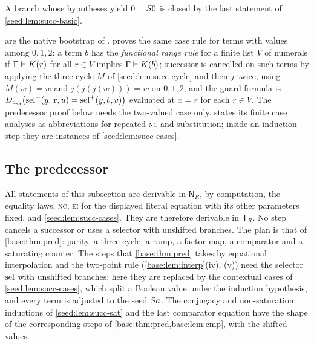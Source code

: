 A branch whose hypotheses yield $0=S 0$ is closed by the last statement of
\cref{seed:lem:succ-basic}.

\begin{remark}\label{seed:rem:succ-cases-variants}
 are the
native bootstrap of .
 proves the same case rule for terms with
values among $0,1,2$: a term $b$ has the \emph{functional range rule} for a
finite list $V$ of numerals if $\Gamma\vdash K(r)$ for all $r\in V$ implies
$\Gamma\vdash K(b)$; successor is cancelled on such terms by applying the
three-cycle $M$ of \cref{seed:lem:succ-cycle} and then $j$ twice, using
$M(w)=w$ and $j(j(j(w)))=w$ on $0,1,2$; and the guard formula is
$D_{a,y}\bigl(\operatorname{sel}^{+}(y,x,u)=\operatorname{sel}^{+}(y,b,v)\bigr)$ evaluated at $x=r$ for
each $r\in V$. The predecessor proof below needs the two-valued case only.
 states its finite case analyses as abbreviations for
repeated \textsc{nc} and substitution; inside an induction step they are
instances of \cref{seed:lem:succ-cases}.
\end{remark}

\subsection{The predecessor}

All statements of this subsection are derivable in $\mathsf{N}_R$, by
computation, the equality laws, \textsc{nc}, \textsc{ei} for the displayed
literal equation with its other parameters fixed, and
\cref{seed:lem:succ-cases}. They are therefore derivable in $\mathsf{T}_R$.
No step cancels a successor or uses a selector with unshifted branches.
The plan is that of \cref{base:thm:pred}: parity, a three-cycle, a ramp, a
factor map, a comparator and a saturating counter. The steps that
\cref{base:thm:pred} takes by equational interpolation and the two-point rule
(\cref{base:lem:interp}(iv), (v)) need the selector $\operatorname{sel}$ with unshifted
branches; here they are replaced by the contextual cases of
\cref{seed:lem:succ-cases}, which split a Boolean value under the induction
hypothesis, and every term is adjusted to the seed $S a$. The conjugacy
and non-saturation inductions of \cref{seed:lem:succ-sat} and the last
comparator equation have the shape of the corresponding steps of
\cref{base:thm:pred,base:lem:cmp}, with the shifted values.

